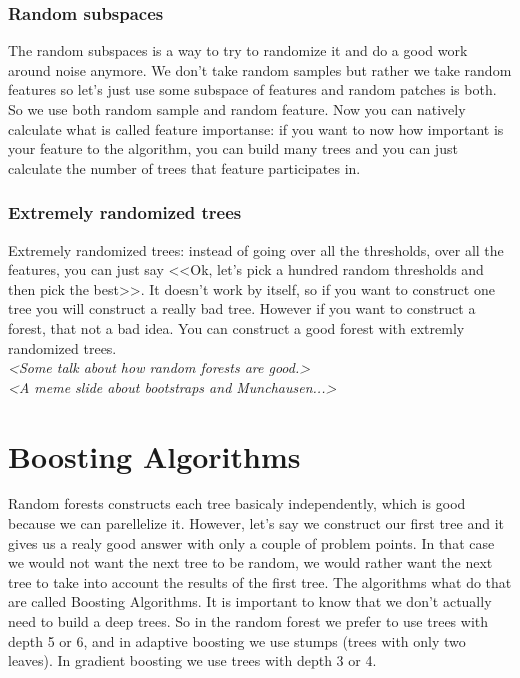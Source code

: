 \subsubsection*{Random subspaces}

The random subspaces is a way to try to randomize it and do a good work around noise anymore. We don't take random samples but rather we take random features so let's just use some subspace of features and random patches is both. So we use both random sample and random feature. Now you can natively calculate what is called feature importanse: if you want to now how important is your feature to the algorithm, you can build many trees and you can just calculate the number of trees that feature participates in. 

\subsubsection*{Extremely randomized trees}

Extremely randomized trees: instead of going over all the thresholds, over all the features, you can just say <<Ok, let's pick a hundred random thresholds and then pick the best>>. It doesn't work by itself, so if you want to construct one tree you will construct a really bad tree. However if you want to construct a forest, that not a bad idea. You can construct a good forest with extremly randomized trees.\\
{\it <Some talk about how random forests are good.>}\\
{\it <A meme slide about bootstraps and Munchausen...>}

\section{Boosting Algorithms}

Random forests constructs each tree basicaly independently, which is good because we can parellelize it. However, let's say we construct our first tree and it gives us a realy good answer with only a couple of problem points. In that case we would not want the next tree to be random, we would rather want the next tree to take into account the results of the first tree. The algorithms what do that are called Boosting Algorithms. It is important to know that we don't actually need to build a deep trees. So in the random forest we prefer to use trees with depth 5 or 6, and in adaptive boosting we use stumps (trees with only two leaves). In gradient boosting we use trees with depth 3 or 4. 

